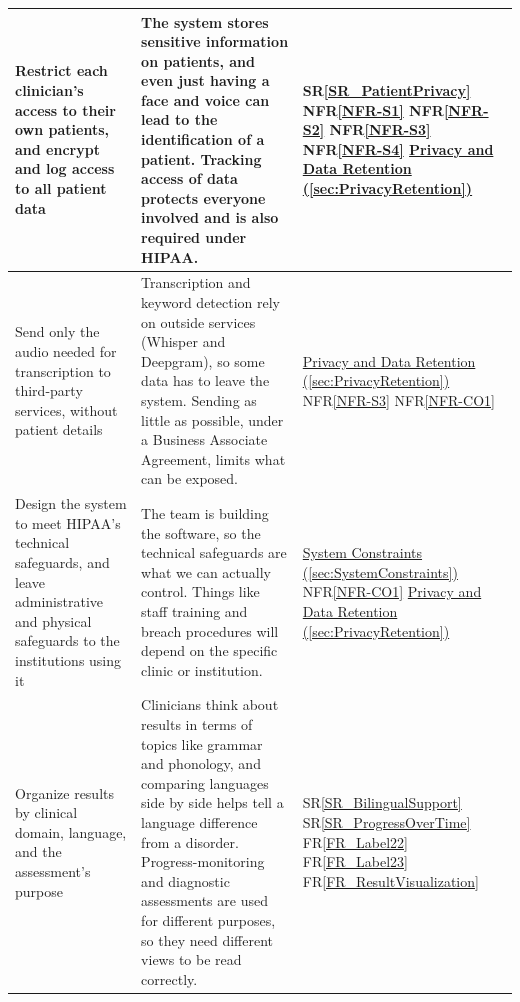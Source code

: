 \documentclass[12pt]{article}
\newcommand{\srref}[1]{SR\ref{#1}}
\newcommand{\rref}[1]{FR\ref{#1}}
\newcommand{\nfrref}[1]{NFR\ref{#1}}
\begin{document}
\begin{longtable}{>{\raggedright\arraybackslash}p{} >{\raggedright\arraybackslash}p{} >{\raggedright\arraybackslash}p{}}
\midrule
Restrict each clinician's access to their own patients, and encrypt and log access to all patient data & 
The system stores sensitive information on patients, and even just having a face and voice can lead to the identification of a patient. Tracking access of data protects everyone involved and is also required under HIPAA. & \srref{SR_PatientPrivacy} \newline \nfrref{NFR-S1} \newline \nfrref{NFR-S2} \newline \nfrref{NFR-S3} \newline \nfrref{NFR-S4} \newline \hyperref[sec:PrivacyRetention]{Privacy and Data Retention (\ref*{sec:PrivacyRetention})}\\
\midrule
Send only the audio needed for transcription to third-party services, without patient details & 
Transcription and keyword detection rely on outside services (Whisper and Deepgram), so some data has to leave the system. Sending as little as possible, under a Business Associate Agreement, limits what can be exposed. & \hyperref[sec:PrivacyRetention]{Privacy and Data Retention (\ref*{sec:PrivacyRetention})} \newline \nfrref{NFR-S3} \newline \nfrref{NFR-CO1}\\
\midrule
Design the system to meet HIPAA's technical safeguards, and leave administrative and physical safeguards to the institutions using it & 
The team is building the software, so the technical safeguards are what we can actually control. Things like staff training and breach procedures will depend on the specific clinic or institution. & \hyperref[sec:SystemConstraints]{System Constraints (\ref*{sec:SystemConstraints})} \newline \nfrref{NFR-CO1} \newline \hyperref[sec:PrivacyRetention]{Privacy and Data Retention (\ref*{sec:PrivacyRetention})}\\
\midrule
Organize results by clinical domain, language, and the assessment's purpose & 
Clinicians think about results in terms of topics like grammar and phonology, and comparing languages side by side helps tell a language difference from a disorder. Progress-monitoring and diagnostic assessments are used for different purposes, so they need different views to be read correctly. & \srref{SR_BilingualSupport} \newline \srref{SR_ProgressOverTime} \newline \rref{FR_Label22} \newline \rref{FR_Label23} \newline \rref{FR_ResultVisualization}\\

\end{longtable}
\end{document}
